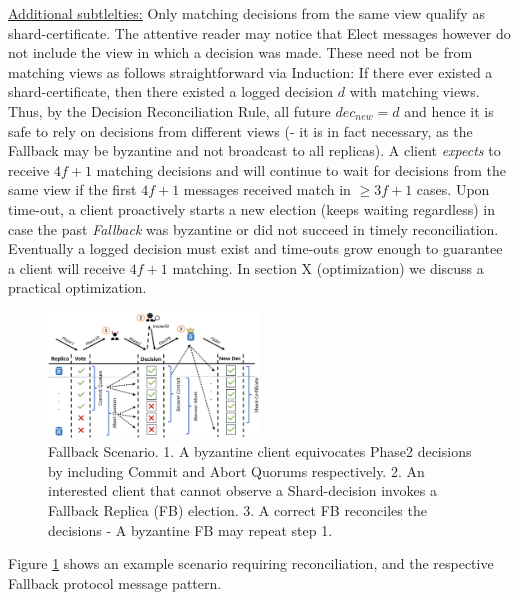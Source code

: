 \underline{Additional subtlelties:} Only matching decisions from the same view qualify as shard-certificate. The attentive reader may notice that Elect messages however do not include the view in which a decision was made. These need not be from matching views as follows straightforward via Induction: If there ever existed a shard-certificate, then there existed a logged decision $d$ with matching views. Thus, by the Decision Reconciliation Rule, all future $dec_{new} = d$ and hence it is safe to rely on decisions from different views (- it is in fact necessary, as the Fallback may be byzantine and not broadcast to all replicas).
A client \textit{expects} to receive $4f+1$ matching decisions and will continue to wait for decisions from the same view if the first $4f+1$ messages received match in $\geq 3f+1$ cases. Upon time-out, a client proactively starts a new election (keeps waiting regardless) in case the past \textit{Fallback} was byzantine or did not succeed in timely reconciliation. Eventually a logged decision must exist and time-outs grow enough to guarantee a client will receive $4f+1$ matching. In section X (optimization) we discuss a practical optimization.
 \\

\begin{figure}
\begin{center}
\includegraphics[width= 0.5\textwidth]{./figures/FBNom.png}
\end{center}
\caption{Fallback Scenario. 1. A byzantine client equivocates Phase2 decisions by including Commit and Abort Quorums respectively. 2. An interested client that cannot observe a Shard-decision invokes a Fallback Replica (FB) election. 3. A correct FB reconciles the decisions - A byzantine FB may repeat step 1.}
\label{fig:FigureFBnom}
\end{figure}

Figure \ref{fig:FigureFBnom} shows an example scenario requiring reconciliation, and the respective Fallback protocol message pattern.


